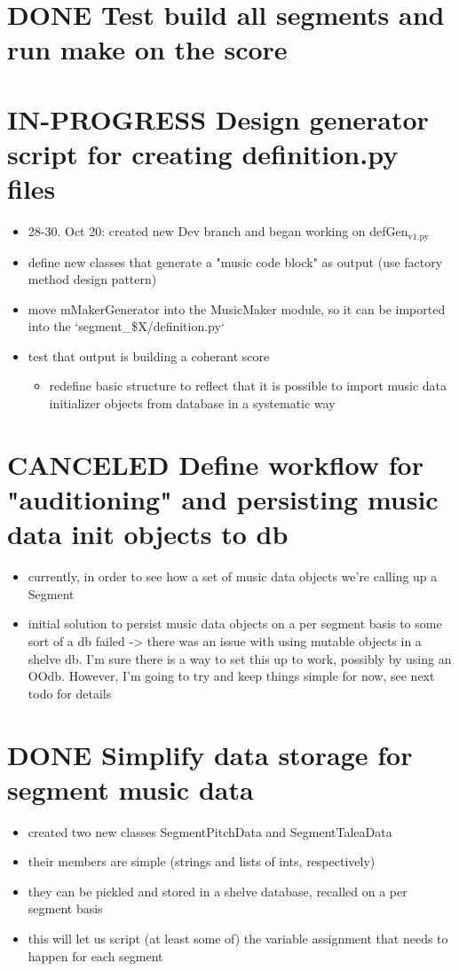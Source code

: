 \documentclass[11pt]{article}
\begin{document}
\section*{{\bfseries\sffamily DONE} Test build all segments and run make on the score}
\label{sec:org8aaf0fa}


\section*{{\bfseries\sffamily IN-PROGRESS} Design generator script for creating definition.py files}
\label{sec:org814748f}
\begin{itemize}
\item 28-30. Oct 20: created new Dev branch and began working on
defGen\(_{\text{v1.py}}\)
\item define new classes that generate a "music code block" as output (use
factory method design pattern)
\item move mMakerGenerator into the MusicMaker module, so it can be
imported into the `segment\_\$X/definition.py`
\item test that output is building a coherant score
\begin{itemize}
\item redefine basic structure to reflect that it is possible to import music data initializer objects from database in a systematic way
\end{itemize}
\end{itemize}
\section*{{\bfseries\sffamily CANCELED} Define workflow for "auditioning" and persisting music data init objects to db}
\label{sec:org5c8fd03}
\begin{itemize}
\item currently, in order to see how a set of music data objects we're calling up a Segment
\item initial solution to persist music data objects on a per segment basis to some sort of a db failed -> there was an issue with using mutable objects in a shelve db. I'm sure there is a way to set this up to work, possibly by using an OOdb. However, I'm going to try and keep things simple for now, see next todo for details
\end{itemize}
\section*{{\bfseries\sffamily DONE} Simplify data storage for segment music data}
\label{sec:org421a52e}
\begin{itemize}
\item created two new classes SegmentPitchData and SegmentTaleaData
\item their members are simple (strings and lists of ints, respectively)
\item they can be pickled and stored in a shelve database, recalled on a per segment basis
\item this will let us script (at least some of) the variable assignment that needs to happen for each segment
\end{itemize}
\end{document}

